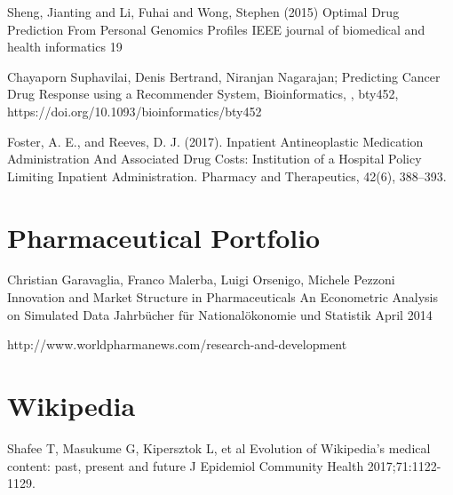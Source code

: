 \begin{thebibliography}{00}
Sheng, Jianting and Li, Fuhai and Wong, Stephen (2015)
\newblock Optimal Drug Prediction From Personal Genomics Profiles
\newblock IEEE journal of biomedical and health informatics 19

 Chayaporn Suphavilai, Denis Bertrand, Niranjan Nagarajan; 
\newblock Predicting Cancer Drug Response using a Recommender System, 
\newblock Bioinformatics, , bty452, https://doi.org/10.1093/bioinformatics/bty452

Foster, A. E., and Reeves, D. J. (2017). 
\newblock Inpatient Antineoplastic Medication Administration And Associated Drug Costs: Institution of a Hospital Policy Limiting Inpatient Administration. 
\newblock Pharmacy and Therapeutics, 42(6), 388–393.

\section{Pharmaceutical Portfolio}

 Christian Garavaglia, Franco Malerba, Luigi Orsenigo, Michele Pezzoni
\newblock Innovation and Market Structure in Pharmaceuticals An Econometric Analysis on Simulated Data
\newblock Jahrbücher für Nationalökonomie und Statistik April 2014

 http://www.worldpharmanews.com/research-and-development

\section{Wikipedia}

 Shafee T, Masukume G, Kipersztok L, et al
\newblock Evolution of Wikipedia’s medical content: past, present and future
\newblock J Epidemiol Community Health 2017;71:1122-1129.


\end{thebibliography}

